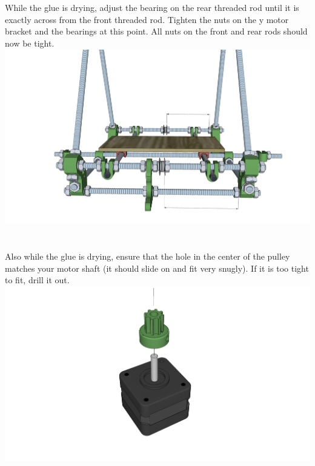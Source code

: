 \documentclass[twoside,openany,a4paper,titlepage]{memoir}
\begin{document}
	\section{}
	While the glue is drying, adjust the bearing on the rear threaded rod until it is exactly across from the
	front threaded rod. Tighten the nuts on the y motor bracket and the bearings at this point. All nuts on the
	front and rear rods should now be tight.\\
	\includegraphics[width=1\linewidth]{graphics/ch6_12.png}
	
	\section{}
	Also while the glue is drying, ensure that the hole in the center of the pulley matches your motor shaft (it
	should slide on and fit very snugly). If it is too tight to fit, drill it out.\\
	\includegraphics[width=1\linewidth]{graphics/ch6_13.png}
	
\end{document}
